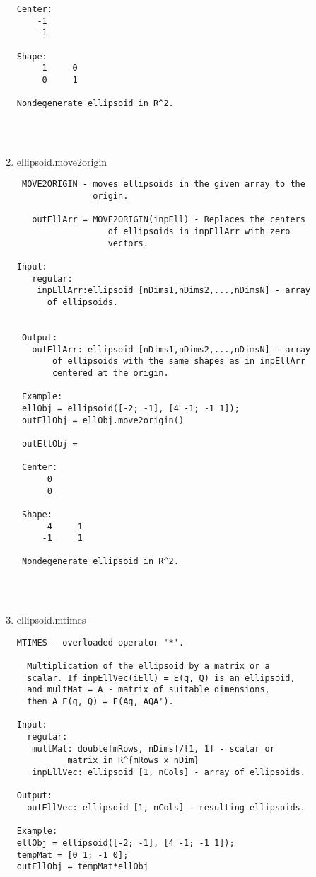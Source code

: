 \begin{enumerate}
\begin{lstlisting}
Center:
    -1
    -1

Shape:
     1     0
     0     1

Nondegenerate ellipsoid in R^2.




\end{lstlisting}
\fontfamily{\familydefault}
\selectfont
\item {ellipsoid.move2origin}
\selectfont
\begin{lstlisting}
 MOVE2ORIGIN - moves ellipsoids in the given array to the
               origin.

   outEllArr = MOVE2ORIGIN(inpEll) - Replaces the centers
                  of ellipsoids in inpEllArr with zero
                  vectors.

Input:
   regular:
    inpEllArr:ellipsoid [nDims1,nDims2,...,nDimsN] - array
      of ellipsoids.


 Output:
   outEllArr: ellipsoid [nDims1,nDims2,...,nDimsN] - array
       of ellipsoids with the same shapes as in inpEllArr
       centered at the origin.

 Example:
 ellObj = ellipsoid([-2; -1], [4 -1; -1 1]);
 outEllObj = ellObj.move2origin()

 outEllObj =

 Center:
      0
      0

 Shape:
      4    -1
     -1     1

 Nondegenerate ellipsoid in R^2.




\end{lstlisting}
\fontfamily{\familydefault}
\selectfont
\item {ellipsoid.mtimes}
\selectfont
\begin{lstlisting}
MTIMES - overloaded operator '*'.

  Multiplication of the ellipsoid by a matrix or a
  scalar. If inpEllVec(iEll) = E(q, Q) is an ellipsoid,
  and multMat = A - matrix of suitable dimensions,
  then A E(q, Q) = E(Aq, AQA').

Input:
  regular:
   multMat: double[mRows, nDims]/[1, 1] - scalar or
          matrix in R^{mRows x nDim}
   inpEllVec: ellipsoid [1, nCols] - array of ellipsoids.

Output:
  outEllVec: ellipsoid [1, nCols] - resulting ellipsoids.

Example:
ellObj = ellipsoid([-2; -1], [4 -1; -1 1]);
tempMat = [0 1; -1 0];
outEllObj = tempMat*ellObj


\end{lstlisting}
\end{enumerate}
